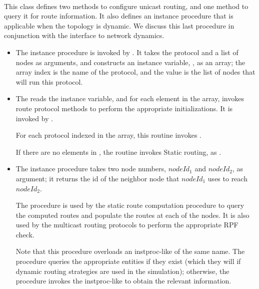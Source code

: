 \paragraph{\protect{}}
This class defines two methods to configure unicast routing,
and one method to query it for route information.
It also defines an instance procedure that is applicable when
the topology is dynamic.
We discuss this last procedure in conjunction
with the interface to network dynamics.
\begin{itemize}
\item The instance procedure
is invoked by .
It takes the protocol and a list of nodes as arguments,
and constructs an instance variable, , as an array;
the array index is the name of the protocol, and the value is the list
of nodes that will run this protocol.
\item The
reads the  instance variable, and 
for each element in the array, 
invokes route protocol methods to perform the appropriate initializations.
It is invoked by
.

For each protocol  indexed in the  array,
this routine invokes
.

If there are no elements in ,
the routine invokes Static routing, as
.

\item The instance procedure
takes two node numbers, $nodeId_1$ and $nodeId_2$, as argument;
it returns the id of the neighbor node that $nodeId_1$ uses to 
reach $nodeId_2$.

The procedure is used by the static route computation procedure to query
the computed routes and populate the routes at each of the nodes.
It is also used by the multicast routing protocols to perform the
appropriate RPF check.

Note that this procedure overloads an instproc-like of the same name.
The procedure queries the appropriate  entities
if they exist
(which they will if dynamic routing strategies are used in the simulation);
otherwise, the procedure invokes the instproc-like to obtain the relevant
information.
\end{itemize}

